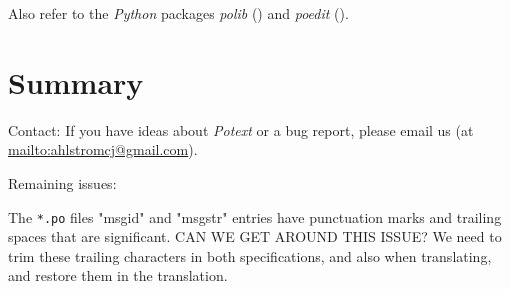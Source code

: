 \documentclass[
 11pt,
 twoside,
 a4paper,
 final                                 %
]{article}
\begin{document}
   Also refer to the \textsl{Python} packages \textsl{polib} (\cite{polib})
   and \textsl{poedit} (\cite{poedit}).







\section{Summary}
\label{sec:summary}

   Contact: If you have ideas about \textsl{Potext} or a bug report,
   please email us (at \url{mailto:ahlstromcj@gmail.com}).

   Remaining issues:

   The \texttt{*.po} files "msgid" and "msgstr" entries have punctuation marks
   and trailing spaces that are significant.
   CAN WE GET AROUND THIS ISSUE?
   We need to trim these trailing characters in both specifications,
   and also when translating, and restore them in the translation.




\printindex
\end{document}

